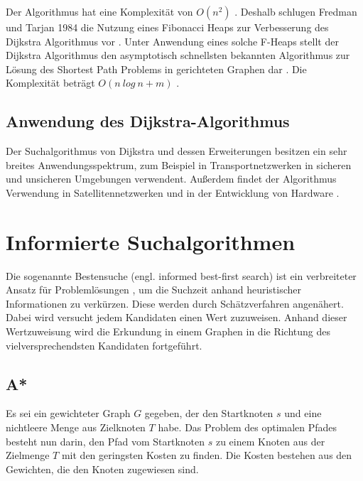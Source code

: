 Der Algorithmus hat eine Komplexität von $O(n^2)$ \cite{Madkour.2017}. Deshalb schlugen Fredman und Tarjan 1984 die Nutzung eines Fibonacci Heaps zur Verbesserung des Dijkstra Algorithmus vor \cite{Fredman.1987}. Unter Anwendung eines solche F-Heaps stellt der Dijkstra Algorithmus den asymptotisch schnellsten bekannten Algorithmus zur Lösung des Shortest Path Problems in gerichteten Graphen dar \cite{Schmitz.2019}.  Die Komplexität beträgt $O(n\ log\ n + m)$ \cite{Madkour.2017}. %



\subsection{Anwendung des Dijkstra-Algorithmus }

Der Suchalgorithmus von Dijkstra und dessen Erweiterungen besitzen ein sehr breites Anwendungsspektrum, zum Beispiel in Transportnetzwerken in sicheren und unsicheren Umgebungen \cite{fuzzyDijk} \cite{publicTrans} %
verwendent. Außerdem findet der Algorithmus Verwendung in Satellitennetzwerken \cite{satelite} und in der Entwicklung von Hardware \cite{hardware}.  %

\section{Informierte Suchalgorithmen}

Die sogenannte Bestensuche (engl. informed best-first search)  %
ist ein verbreiteter Ansatz für Problemlösungen %
, um die Suchzeit %
anhand heuristischer Informationen zu verkürzen. Diese %
werden durch Schätzverfahren angenähert. Dabei wird versucht jedem Kandidaten %
einen Wert zuzuweisen. Anhand dieser Wertzuweisung wird die Erkundung in einem Graphen in die Richtung des vielversprechendsten Kandidaten fortgeführt. 

\subsection{A*} 

Es sei ein gewichteter Graph $G$ gegeben, der den Startknoten $s$ und eine nichtleere Menge aus Zielknoten $T$ habe. Das Problem des optimalen Pfades besteht nun darin, den Pfad vom Startknoten $s$ zu einem Knoten aus der Zielmenge $T$ mit den geringsten Kosten zu finden. %
Die Kosten bestehen aus den Gewichten, die den Knoten zugewiesen sind\cite{RinaDechterandJudeaPearl.1983}.

